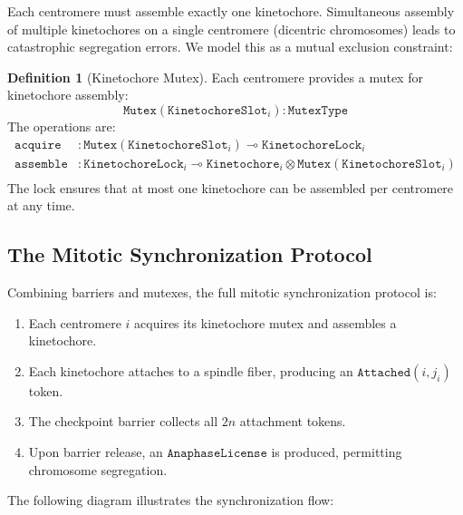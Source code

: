 \documentclass[12pt,a4paper]{article}
\theoremstyle{plain}
\theoremstyle{definition}
\newtheorem{definition}[theorem]{Definition}
\begin{document}
Each centromere must assemble exactly one kinetochore. Simultaneous assembly of multiple kinetochores on a single centromere (dicentric chromosomes) leads to catastrophic segregation errors. We model this as a mutual exclusion constraint:

\begin{definition}[Kinetochore Mutex]\label{def:kinetochore-mutex}
Each centromere provides a mutex for kinetochore assembly:
\[
  \texttt{Mutex}(\texttt{KinetochoreSlot}_i) : \texttt{MutexType}
\]
The operations are:
\begin{align*}
  \texttt{acquire} &: \texttt{Mutex}(\texttt{KinetochoreSlot}_i) \multimap \texttt{KinetochoreLock}_i \\
  \texttt{assemble} &: \texttt{KinetochoreLock}_i \multimap \texttt{Kinetochore}_i \otimes \texttt{Mutex}(\texttt{KinetochoreSlot}_i) \\
\end{align*}
The lock ensures that at most one kinetochore can be assembled per centromere at any time.
\end{definition}

\subsection{The Mitotic Synchronization Protocol}

Combining barriers and mutexes, the full mitotic synchronization protocol is:

\begin{enumerate}[label=\textbf{Step \arabic*:}]
  \item Each centromere $i$ acquires its kinetochore mutex and assembles a kinetochore.
  \item Each kinetochore attaches to a spindle fiber, producing an $\texttt{Attached}(i, j_i)$ token.
  \item The checkpoint barrier collects all $2n$ attachment tokens.
  \item Upon barrier release, an $\texttt{AnaphaseLicense}$ is produced, permitting chromosome segregation.
\end{enumerate}

The following diagram illustrates the synchronization flow:

\begin{center}
\end{center}
\end{document}
